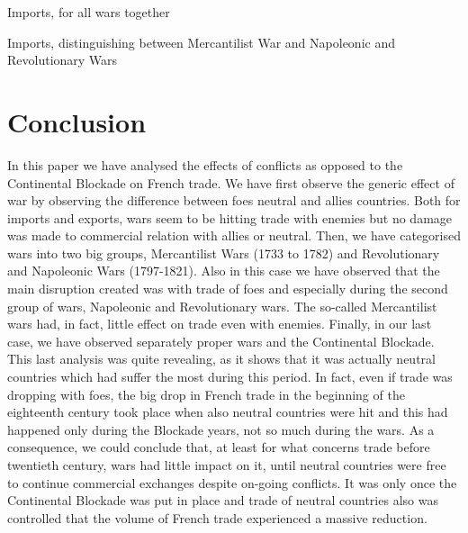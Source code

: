 \documentclass[12pt,a4paper,notitlepage,english]{article}
\begin{document}
\begin{table}
\begin{center}
\caption {Imports, for all wars together} 
\label{table:import_class_war}
\renewcommand{\arraystretch}{0.6}

\end{center}
\end{table}
\begin{table}
\begin{center}
\caption {Imports, distinguishing between Mercantilist War and Napoleonic and Revolutionary Wars} \label{table:import_class_merc}
\renewcommand{\arraystretch}{0.6}

\end{center}
\end{table}
\fi

\section{Conclusion}
In this paper we have analysed the effects of conflicts as opposed to the Continental Blockade on French trade. We have first observe the generic effect of war by observing the difference between foes neutral and allies countries. Both for imports and exports, wars seem to be hitting trade with enemies but no damage was made to commercial relation with allies or neutral. Then, we have categorised wars into two big groups, Mercantilist Wars (1733 to 1782) and Revolutionary and Napoleonic Wars (1797-1821). Also in this case we have observed that the main disruption created was with trade of foes and especially during the second group of wars, Napoleonic and Revolutionary wars. The so-called Mercantilist wars had, in fact, little effect on trade even with enemies. Finally, in our last case, we have observed separately proper wars and the Continental Blockade. This last analysis was quite revealing, as it shows that it was actually neutral countries which had suffer the most during this period. In fact, even if trade was dropping with foes, the big drop in French trade in the beginning of the eighteenth century took place when also neutral countries were hit and this had happened only during the Blockade years, not so much during the wars. As a consequence, we could conclude that, at least for what concerns trade before twentieth century, wars had little impact on it, until neutral countries were free to continue commercial exchanges despite on-going conflicts. It was only once the Continental Blockade was put in place and trade of neutral countries also was controlled that the volume of French trade experienced a massive reduction. 


\pagebreak

\renewcommand{\baselinestretch}{1.0}\normalsize



\end{document}
